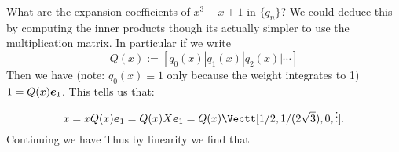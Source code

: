 \begin{example} What are the expansion coefficients of $x^3 - x + 1$ in $\{q_n\}$? We could deduce this by computing the inner products though its actually simpler to use the multiplication matrix. In particular if we write
\[
Q(x) := [q_0(x) | q_1(x) | q_2(x) | \ensuremath{\cdots}]
\]
Then we have (note: $q_0(x) \ensuremath{\equiv} 1$ only because the weight integrates to 1) $1 = Q(x) \bm{{\mbox{\boldmath$e$\unboldmath}}}_1$. This tells us that:
\[
x = x Q(x) \ensuremath{\bm{\e}}_1 = Q(x) X \ensuremath{\bm{\e}}_1 = Q(x) \Vectt[1/2, 1/(2\sqrt{3}), 0, \ensuremath{\vdots}].
\]
Continuing we have
Thus by linearity we find that
\end{example}




